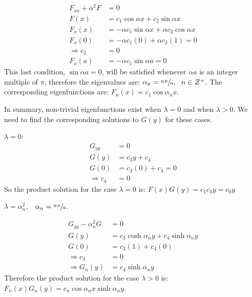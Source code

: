 \begin{align*}
F_{xx}+\alpha^2 F &= 0 \\
F(x) &= c_1 \cos{\alpha x} + c_2 \sin{\alpha x} \\
F_{x}(x) &= -\alpha c_1 \sin{\alpha x} + \alpha c_2 \cos{\alpha x} \\
F_{x}(0) &= -\alpha c_1 (0) + \alpha c_2 (1) = 0 \\
\Rightarrow c_2 &= 0 \\
F_{x}(a) &= -\alpha c_1 \sin{\alpha a} = 0
\end{align*}
This last condition, $\sin{\alpha a} = 0$, will be satisfied whenever $\alpha a$ is an integer multiple of $\pi$, therefore the eigenvalues are: $\alpha_n = \sfrac{n \pi}{a}, \ \ n\in \mathcal{Z}^+$.  The corresponding eigenfunctions are: $F_n(x) = c_1 \cos{\alpha_n x}$.

\vspace{0.25cm}

\noindent In summary, non-trivial eigenfunctions exist when $\lambda = 0$ and when $\lambda >0$.  We need to find the corresponding solutions to $G(y)$ for these cases.

\vspace{0.1cm}

\noindent\underline{$\lambda = 0$}: 
\begin{align*}
G_{yy} &= 0 \\
G(y) &= c_3y + c_4 \\
G(0) &= c_3(0) + c_4 = 0 \\
\Rightarrow c_4 &= 0
\end{align*} 
So the product solution for the case $\lambda = 0$ is: $F(x)G(y) = c_1 c_3y = c_0y$

\vspace{0.25cm}

\noindent\underline{$\lambda = \alpha_n^2$}, $\ \ \alpha_n = \sfrac{n \pi}{a}$.

\begin{align*}
G_{yy} - \alpha_n^2 G &= 0 \\
G(y) &= c_3 \cosh{\alpha_n y} + c_4 \sinh{\alpha_n y} \\
G(0) &= c_3 (1) + c_4(0) \\
\Rightarrow c_3 &= 0 \\
\Rightarrow G_n(y) &= c_4 \sinh{\alpha_n y}
\end{align*}
Therefore the product solution for the case $\lambda > 0$ is: $F_n(x)G_n(y) = c_n \cos{\alpha_n x} \sinh{\alpha_n y}$.


